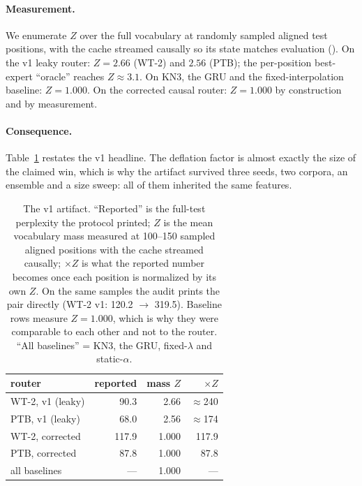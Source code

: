 \documentclass[11pt]{article}
\begin{document}
\paragraph{Measurement.} We enumerate $Z$ over the full vocabulary at randomly
sampled aligned test positions, with the cache streamed causally so its state
matches evaluation (). On the v1
leaky router: $Z = 2.66$ (WT-2) and $2.56$ (PTB); the per-position
best-expert ``oracle'' reaches $Z \approx 3.1$. On KN3, the GRU and the
fixed-interpolation baseline: $Z = 1.000$. On the corrected causal router:
$Z = 1.000$ by construction and by measurement.

\paragraph{Consequence.} Table~\ref{tab:audit} restates the v1 headline. The
deflation factor is almost exactly the size of the claimed win, which is why
the artifact survived three seeds, two corpora, an ensemble and a size sweep:
all of them inherited the same features.

\begin{table}[t]
\centering\small
\setlength{\tabcolsep}{4pt}
\begin{tabular}{lrrr}
\toprule
router & reported & mass $Z$ & $\times Z$ \\
\midrule
WT-2, v1 (leaky) & 90.3 & 2.66 & $\approx$240 \\
PTB, v1 (leaky) & 68.0 & 2.56 & $\approx$174 \\
WT-2, corrected & 117.9 & 1.000 & 117.9 \\
PTB, corrected & 87.8 & 1.000 & 87.8 \\
all baselines & --- & 1.000 & --- \\
\bottomrule
\end{tabular}
\caption{The v1 artifact. ``Reported'' is the full-test perplexity the
protocol printed; $Z$ is the mean vocabulary mass measured at 100--150 sampled
aligned positions with the cache streamed causally; $\times Z$ is what the
reported number becomes once each position is normalized by its own $Z$. On the
same samples the audit prints the pair directly (WT-2 v1: 120.2 $\rightarrow$
319.5). Baseline rows measure $Z=1.000$, which is why they were comparable to
each other and not to the router. ``All baselines'' = KN3, the GRU,
fixed-$\lambda$ and static-$\alpha$.}
\label{tab:audit}
\end{table}
\end{document}
